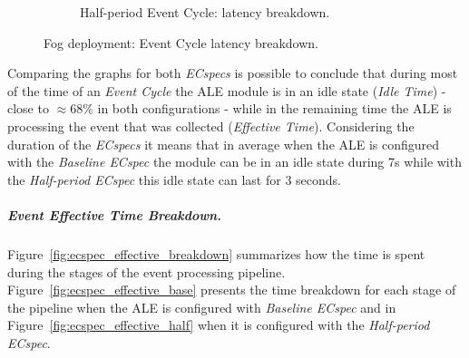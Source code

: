 \begin{figure}[ht!]
\begin{subfigure}{.5\textwidth}
          \caption{Half-period Event Cycle: latency breakdown.}
          \label{fig:ecspec_half}
        \end{subfigure}
        \caption[Fog deployment: event latency breakdown.]{Fog deployment: Event Cycle latency breakdown.}
        \label{fig:ecspec_breakdown}
      \end{figure}

      Comparing the graphs for both \textit{ECspecs} is possible to conclude that during most of the time of
      an \textit{Event Cycle} the \gls{ALE} module is in an idle state (\textit{Idle Time}) - close to $\approx68\%$
      in both configurations - while in the remaining time the \gls{ALE} is processing the event that was
      collected (\textit{Effective Time}). Considering the duration of the \textit{ECspecs} it means that in
      average when the \gls{ALE} is configured with the \textit{Baseline ECspec} the module can be in an idle
      state during 7s while with the \textit{Half-period ECspec} this idle state can last for 3 seconds.

      \subparagraph{Event Effective Time Breakdown.}
      \label{subp:fog_event_effective_breakdown}
      Figure~\ref{fig:ecspec_effective_breakdown} summarizes how the time is spent during the stages of the
      event processing pipeline. Figure~\ref{fig:ecspec_effective_base} presents the time breakdown for
      each stage of the pipeline when the \gls{ALE} is configured with \textit{Baseline ECspec} and in
      Figure~\ref{fig:ecspec_effective_half} when it is configured with the \textit{Half-period ECspec}.\\

